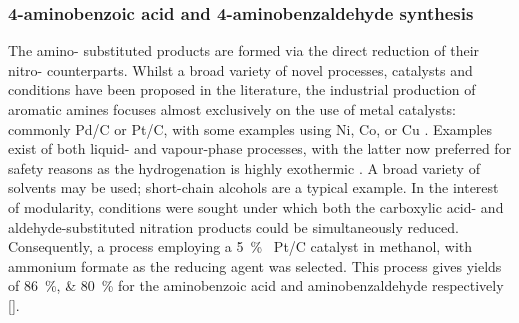 \subsubsection{4-aminobenzoic acid and 4-aminobenzaldehyde synthesis}
The amino- substituted products are formed via the direct reduction of their nitro- counterparts.
Whilst a broad variety of novel processes, catalysts and conditions have been proposed in the literature, the industrial production of aromatic amines focuses almost exclusively on the use of metal catalysts: commonly Pd/C or Pt/C, with some examples using Ni, Co, or Cu \cite{vogt_amines_2000,cartolano_amines_2004}.
Examples exist of both liquid- and vapour-phase processes, with the latter now preferred for safety reasons as the hydrogenation is highly exothermic \cite{vogt_amines_2000}.
A broad variety of solvents may be used; short-chain alcohols are a typical example.
In the interest of modularity, conditions were sought under which both the carboxylic acid- and aldehyde-substituted nitration products could be simultaneously reduced.
Consequently, a process employing a \SI{5}{\percent{}} Pt/C catalyst in methanol, with ammonium formate as the reducing agent was selected.
This process gives yields of \SIlist{86;80}{\percent} for the aminobenzoic acid and aminobenzaldehyde respectively [].




